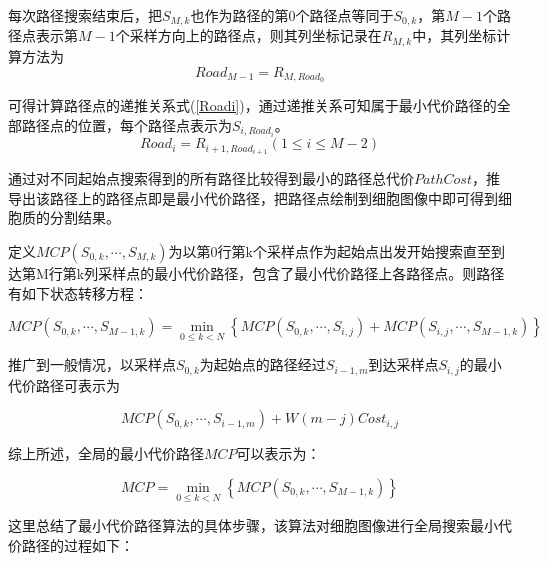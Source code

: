 \documentclass[nomlist,masters]{seuthesix}
\begin{document}
每次路径搜索结束后，把$S_{M,k}$也作为路径的第0个路径点等同于$S_{0,k}$，第$M-1$个路径点表示第$M-1$个采样方向上的路径点，则其列坐标记录在$R_{M,k}$中，其列坐标计算方法为
\begin{equation}
Road_{M-1}=R_{M,Road_{0}}
\label{Road1}
\end{equation}

可得计算路径点的递推关系式(\ref{Roadi})，通过递推关系可知属于最小代价路径的全部路径点的位置，每个路径点表示为$S_{i,Road_{i}}$。
\begin{equation}
Road_{i}=R_{i+1,Road_{i+1}}(1\leq i\leq M-2)
\label{Roadi}
\end{equation}

通过对不同起始点搜索得到的所有路径比较得到最小的路径总代价$PathCost$，推导出该路径上的路径点即是最小代价路径，把路径点绘制到细胞图像中即可得到细胞质的分割结果。

定义$MCP(S_{0,k},\cdots ,S_{M,k})$为以第0行第k个采样点作为起始点出发开始搜索直至到达第M行第k列采样点的最小代价路径，包含了最小代价路径上各路径点。则路径有如下状态转移方程：
 

\begin{equation}
MCP(S_{0,k},\cdots ,S_{M-1,k})=\min_{0\leqslant k < N}\left \{ MCP(S_{0,k},\cdots ,S_{i,j})+MCP(S_{i,j},\cdots ,S_{M-1,k}) \right \}
\label{MCPk}
\end{equation}

推广到一般情况，以采样点$S_{0,k}$为起始点的路径经过$S_{i-1,m}$到达采样点$S_{i,j}$的最小代价路径可表示为

\begin{equation}
 MCP(S_{0,k},\cdots ,S_{i-1,m})+ W(m-j)Cost_{i,j}
\label{MCPnext}
\end{equation}

综上所述，全局的最小代价路径$MCP$可以表示为：

\begin{equation}
MCP =\min_{0\leqslant k < N}\left \{ MCP(S_{0,k},\cdots ,S_{M-1,k}) \right \}
\label{MCP}
\end{equation}

这里总结了最小代价路径算法的具体步骤，该算法对细胞图像进行全局搜索最小代价路径的过程如下： 
\end{document}
